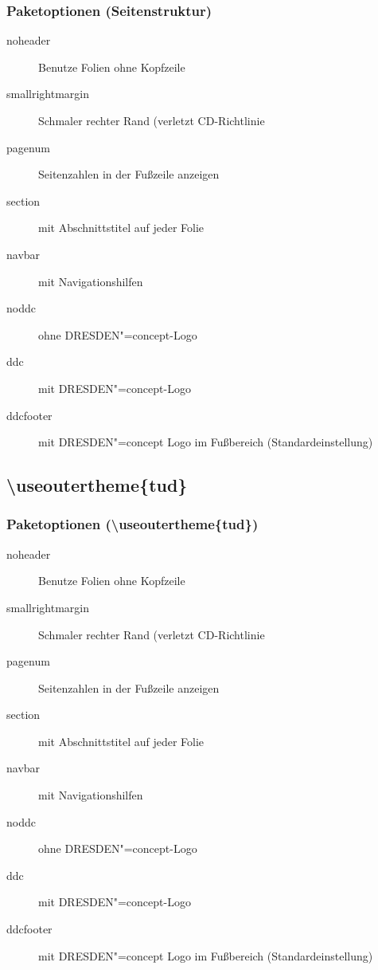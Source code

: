 \documentclass[presentation,t]{beamer}
\begin{document}
\subsubsection{Paketoptionen (Seitenstruktur)}
\label{sec:org2801829}
\begin{description}
\item[{noheader}] Benutze Folien ohne Kopfzeile
\item[{smallrightmargin}] Schmaler rechter Rand (verletzt CD-Richtlinie
\item[{pagenum}] Seitenzahlen in der Fußzeile anzeigen
\item[{section}] mit Abschnittstitel auf jeder Folie
\item[{navbar}] mit Navigationshilfen
\item[{noddc}] ohne DRESDEN"=concept-Logo
\item[{ddc}] mit DRESDEN"=concept-Logo
\item[{ddcfooter}] mit DRESDEN"=concept Logo im Fußbereich (Standardeinstellung)
\end{description}
\subsection{\textbackslash useoutertheme\{tud\}}
\label{sec:org93372dd}
\subsubsection{Paketoptionen (\textbackslash useoutertheme\{tud\})}
\label{sec:orgf7e1617}
\begin{description}
\item[{noheader}] Benutze Folien ohne Kopfzeile
\item[{smallrightmargin}] Schmaler rechter Rand (verletzt CD-Richtlinie
\item[{pagenum}] Seitenzahlen in der Fußzeile anzeigen
\item[{section}] mit Abschnittstitel auf jeder Folie
\item[{navbar}] mit Navigationshilfen
\item[{noddc}] ohne DRESDEN"=concept-Logo
\item[{ddc}] mit DRESDEN"=concept-Logo
\item[{ddcfooter}] mit DRESDEN"=concept Logo im Fußbereich (Standardeinstellung)
\end{description}
\end{document}

